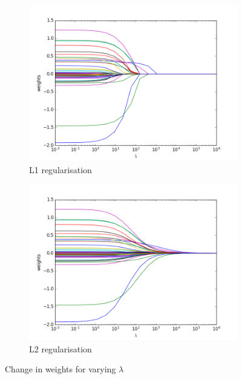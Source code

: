 \documentclass[paper=a4,fontsize=12pt]{article}
\begin{document}
\begin{figure}[H]
\centering
\begin{subfigure}{.5\textwidth}
  \centering
  \includegraphics[width=1\linewidth]{01_L1regularisation_of_wm}
  \caption{L1 regularisation}
  \label{fig:sub1}
\end{subfigure}%
\begin{subfigure}{.5\textwidth}
  \centering
  \includegraphics[width=1\linewidth]{02_L2regularisation_of_wm}
  \caption{L2 regularisation}
  \label{fig:sub2}
\end{subfigure}
\caption{Change in weights for varying $\lambda$}
\label{fig:test}
\end{figure}
\end{document}
